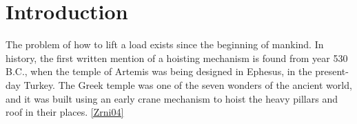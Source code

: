 \documentclass[12pt,a4paper,oneside,pdftex]{report}
\begin{document}




\chapter{Introduction}
\label{chapter:introduction}

The problem of how to lift a load exists since the beginning of mankind. In history, the first written mention of a hoisting mechanism is found from year 530 B.C., when the temple of Artemis was being designed in Ephesus, in the present-day Turkey. The Greek temple was one of the seven wonders of the ancient world, and it was built using an early crane mechanism to hoist the heavy pillars and roof in their places. \ref{Zrni04}
\end{document}

